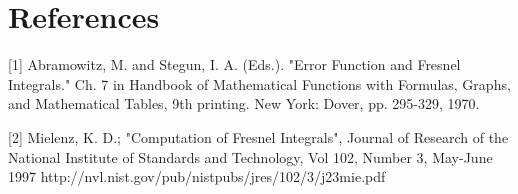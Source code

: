 \documentclass[a4paper,11pt]{article}
\begin{document}
\section{References}

[1] Abramowitz, M. and Stegun, I. A. (Eds.). "Error Function and Fresnel 
      Integrals." Ch. 7 in Handbook of Mathematical Functions with
      Formulas, Graphs, and Mathematical Tables, 9th printing. New York:
      Dover, pp. 295-329, 1970.
 
[2] Mielenz, K. D.; "Computation of Fresnel Integrals", Journal of
      Research of the National Institute of Standards and Technology,
      Vol 102, Number 3, May-June 1997
         http://nvl.nist.gov/pub/nistpubs/jres/102/3/j23mie.pdf
\end{document}
